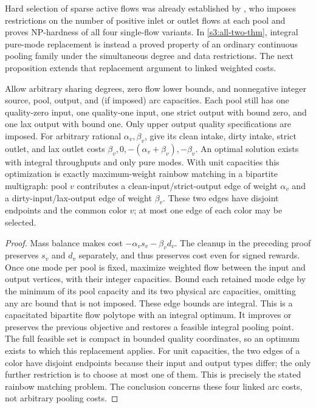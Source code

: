 Hard selection of sparse active flows was already established by
\citet[Definition~2.2 and Proposition~3.1, p.~96]{s3:haugland2019-single-flow},
who imposes restrictions on the number of positive inlet or outlet flows
at each pool and proves NP-hardness of all four single-flow variants.
In \cref{s3:all-two-thm}, integral pure-mode replacement is instead a
proved property of an ordinary continuous pooling family under the
simultaneous degree and data restrictions. The next proposition extends
that replacement argument to linked weighted costs.

\begin{proposition}\label{s3:weighted}
Allow arbitrary sharing degrees, zero flow lower bounds, and nonnegative
integer source, pool, output, and (if imposed) arc capacities. Each pool
still has one quality-zero input, one
quality-one input, one strict output with bound zero, and one lax output
with bound one. Only upper output quality specifications are imposed.
For arbitrary rational $\alpha_v,\beta_v$, give its clean
intake, dirty intake, strict outlet, and lax outlet costs
$\beta_v,0,-(\alpha_v+\beta_v),-\beta_v$. An optimal solution exists
with integral throughputs and only pure modes. With unit capacities
this optimization is exactly maximum-weight rainbow matching in a
bipartite multigraph: pool $v$ contributes a clean-input/strict-output
edge of weight $\alpha_v$ and a dirty-input/lax-output edge of weight
$\beta_v$. These two edges have disjoint endpoints and the common color
$v$; at most one edge of each color may be selected.
\end{proposition}
\begin{proof}
Mass balance makes cost $-\alpha_vs_v-\beta_vd_v$. The cleanup in the
preceding proof preserves $s_v$ and $d_v$ separately, and thus preserves
cost even for signed rewards. Once one mode per pool is fixed, maximize
weighted flow between the input and output vertices, with their integer
capacities. Bound each retained mode edge by the minimum of its pool
capacity and its two physical arc capacities, omitting any arc bound
that is not imposed. These edge bounds are integral. This is a capacitated
bipartite flow polytope with an integral optimum. It improves or preserves
the previous objective and restores a feasible integral pooling point.
The full feasible set is compact in bounded quality coordinates, so an
optimum exists to which this replacement applies. For unit capacities,
the two edges of a color have disjoint endpoints because their input and
output types differ; the only further restriction is to choose at most
one of them. This is precisely the stated rainbow matching problem.
The conclusion concerns these four linked arc costs, not arbitrary
pooling costs.
\end{proof}

